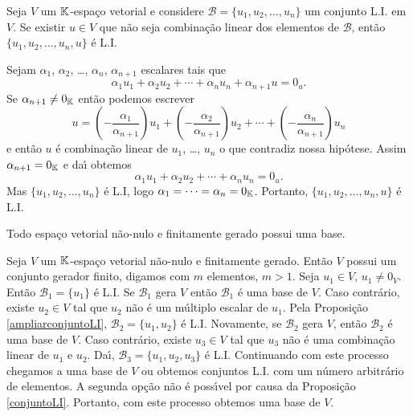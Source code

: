 \begin{proposicao}\label{ampliarconjuntoLI}
	Seja $V$ um $\mathbb{K}$-espa\c{c}o vetorial e considere $\mathcal{B} = \{u_1, u_2, \dots, u_n\}$ um conjunto L.I. em $V$. Se existir $u \in V$ que n\~ao seja combina\c{c}\~ao linear dos elementos de $\mathcal{B}$, ent\~ao $\{u_1, u_2, \dots, u_n, u\}$ \'e L.I.
\end{proposicao}
\begin{prova}
	Sejam $\alpha_1$, $\alpha_2$, \dots, $\alpha_n$, $\alpha_{n + 1}$ escalares tais que
	\[
		\alpha_1u_1 + \alpha_2u_2 + \cdots + \alpha_nu_n + \alpha_{n + 1}u = 0_u.
	\]
	Se $\alpha_{n + 1} \ne 0_{\mathbb{K}}$ ent\~ao podemos escrever
	\[
		u = \left(-\dfrac{\alpha_1}{\alpha_{n + 1}}\right)u_1 + \left(-\dfrac{\alpha_2}{\alpha_{n + 1}}\right)u_2 + \cdots + \left(-\dfrac{\alpha_n}{\alpha_{n + 1}}\right)u_n
	\]
	e ent\~ao $u$ \'e combina\c{c}\~ao linear de $u_1$, \dots, $u_n$ o que contradiz nossa hip\'otese. Assim $\alpha_{n + 1} = 0_{\mathbb{K}}$ e da{\'\i} obtemos
	\[
		\alpha_1u_1 + \alpha_2u_2 + \cdots + \alpha_nu_n = 0_u.
	\]
	Mas $\{u_1, u_2, \dots, u_n\}$ \'e L.I, logo $\alpha_1 = \cdots = \alpha_n = 0_{\mathbb{K}}$. Portanto, $\{u_1, u_2, \dots, u_n, u\}$ \'e L.I.
\end{prova}

\begin{teorema}
	Todo espa\c{c}o vetorial n\~ao-nulo e finitamente gerado possui uma base.
\end{teorema}
\begin{prova}
	Seja $V$ um $\mathbb{K}$-espa\c{c}o vetorial n\~ao-nulo e finitamente gerado. Ent\~ao $V$ possui um conjunto gerador finito, digamos com $m$ elementos, $m > 1$. Seja $u_1 \in V$, $u_1 \ne 0_V$. Ent\~ao $\mathcal{B}_1 = \{u_1\}$ \'e L.I. Se $\mathcal{B}_1$ gera $V$ ent\~ao $\mathcal{B}_1$ \'e uma base de $V$. Caso contr\'ario, existe $u_2 \in V$ tal que $u_2$ n\~ao \'e um m\'ultiplo escalar de $u_1$. Pela Proposi\c{c}\~ao \ref{ampliarconjuntoLI}, $\mathcal{B}_2 = \{u_1, u_2\}$ \'e L.I. Novamente, se $\mathcal{B}_2$ gera $V$, ent\~ao $\mathcal{B}_2$ \'e uma base de $V$. Caso contr\'ario, existe $u_3 \in V$ tal que $u_3$ n\~ao \'e uma combina\c{c}\~ao linear de $u_1$ e $u_2$. Da{\'\i}, $\mathcal{B}_3 = \{u_1, u_2, u_3\}$ \'e L.I. Continuando com este processo chegamos a uma base de $V$ ou obtemos conjuntos L.I. com um n\'umero arbitr\'ario de elementos. A segunda op\c{c}\~ao n\~ao \'e poss{\'\i}vel por causa da Proposi\c{c}\~ao \ref{conjuntoLI}. Portanto, com este processo obtemos uma base de $V$.
\end{prova}


